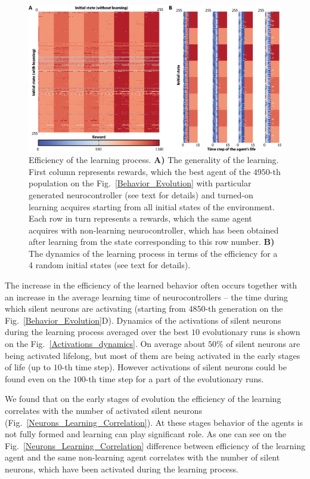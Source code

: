 \documentclass[letterpaper]{article}
\begin{document}
\begin{figure}[!t]
\begin{center}
\includegraphics[width=16cm]{Fig6.eps}
\caption{Efficiency of the learning process. \textbf{A)} The generality of the learning. First column represents rewards, which the best agent of the $4950$-th population on the Fig.~\ref{Behavior_Evolution} with particular generated neurocontroller (see text for details) and turned-on learning acquires starting from all initial states of the environment. Each row in turn represents a rewards, which the same agent acquires with non-learning neurocontroller, which has been obtained after learning from the state corresponding to this row number. \textbf{B)} The dynamics of the learning process in terms of the efficiency for a 4 random initial states (see text for details).}
\label{Learning_Process}
\end{center}
\end{figure}

The increase in the efficiency of the learned behavior often occurs together with an increase in the average learning time of neurocontrollers -- the time during which silent neurons are activating (starting from $4850$-th generation on the Fig.~\ref{Behavior_Evolution}D). Dynamics of the activations of silent neurons during the learning process averaged over the best $10$ evolutionary runs is shown on the Fig.~\ref{Activations_dynamics}. On average about $50\%$ of silent neurons are being activated lifelong, but most of them are being activated in the early stages of life (up to $10$-th time step). However activations of silent neurons could be found even on the $100$-th time step for a part of the evolutionary runs.  

We found that on the early stages of evolution the efficiency of the learning correlates with the number of activated silent neurons (Fig.~\ref{Neurons_Learning_Correlation}). At these stages behavior of the agents is not fully formed and learning can play significant role. As one can see on the Fig.~\ref{Neurons_Learning_Correlation} difference between efficiency of the learning agent and the same non-learning agent correlates with the number of silent neurons, which have been activated during the learning process. 
\end{document}
